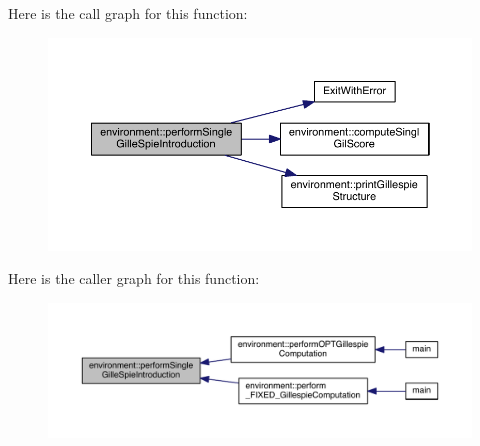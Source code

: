Here is the call graph for this function\+:\nopagebreak
\begin{figure}[H]
\begin{center}
\leavevmode
\includegraphics[width=350pt]{a00013_a30a0827eed2860d03d5fa5318fcf86b0_cgraph}
\end{center}
\end{figure}




Here is the caller graph for this function\+:\nopagebreak
\begin{figure}[H]
\begin{center}
\leavevmode
\includegraphics[width=350pt]{a00013_a30a0827eed2860d03d5fa5318fcf86b0_icgraph}
\end{center}
\end{figure}


